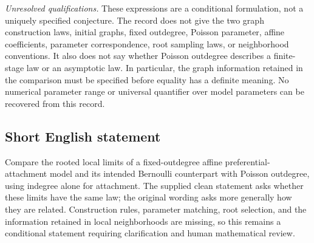 \documentclass[11pt]{article}
\begin{document}
\emph{Unresolved qualifications.} These expressions are a conditional formulation, not a uniquely specified conjecture. The record does not give the two graph construction laws, initial graphs, fixed outdegree, Poisson parameter, affine coefficients, parameter correspondence, root sampling laws, or neighborhood conventions. It also does not say whether Poisson outdegree describes a finite-stage law or an asymptotic law. In particular, the graph information retained in the comparison must be specified before equality has a definite meaning. No numerical parameter range or universal quantifier over model parameters can be recovered from this record.
\subsection{Short English statement}
Compare the rooted local limits of a fixed-outdegree affine preferential-attachment model and its intended Bernoulli counterpart with Poisson outdegree, using indegree alone for attachment. The supplied clean statement asks whether these limits have the same law; the original wording asks more generally how they are related. Construction rules, parameter matching, root selection, and the information retained in local neighborhoods are missing, so this remains a conditional statement requiring clarification and human mathematical review.
\end{document}

